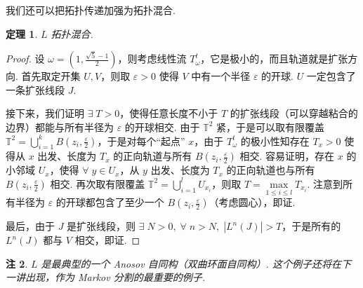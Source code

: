 \documentclass[11pt, a4paper, oneside]{ctexart}
\newtheorem{theorem}{定理}[section]
\newtheorem{remark}[theorem]{注}
\newcommand{\T}{\mathbb{T}}
\newcommand{\abs}[1]{\left|{#1}\right|}
\begin{document}
    我们还可以把拓扑传递加强为拓扑混合.
    \begin{theorem}
        $L$ 拓扑混合.
    \end{theorem}
    \begin{proof}
        设 $\omega=(1,\frac{\sqrt{5}-1}{2})$，则考虑线性流 $T_{\omega}^t$，它是极小的，而且轨道就是扩张方向. 首先取定开集 $U,V$，则取 $\varepsilon>0$ 使得 $V$ 中有一个半径 $\varepsilon$ 的开球. $U$ 一定包含了一条扩张线段 $J$.
        
        接下来，我们证明 $\exists\; T>0$，使得任意长度不小于 $T$ 的扩张线段（可以穿越粘合的边界）都能与所有半径为 $\varepsilon$ 的开球相交. 由于 $\T^2$ 紧，于是可以取有限覆盖 $\T^2=\bigcup\limits_{i=1}^{k}B(z_i,\frac{\varepsilon}{2})$，于是对每个“起点” $x$，由于 $T_{\omega}^t$ 的极小性知存在 $T_x>0$ 使得从 $x$ 出发、长度为 $T_x$ 的正向轨道与所有 $B(z_i,\frac{\varepsilon}{2})$ 相交. 容易证明，存在 $x$ 的小邻域 $U_x$，使得 $\forall\; y\in U_x$，从 $y$ 出发、长度为 $T_x$ 的正向轨道也与所有 $B(z_i,\frac{\varepsilon}{2})$ 相交. 再次取有限覆盖 $\T^2=\bigcup\limits_{i=1}^{l}U_{x_i}$，则取 $T=\max\limits_{1\leq i\leq l}T_{x_i}$. 注意到所有半径为 $\varepsilon$ 的开球都包含了至少一个 $B(z_i,\frac{\varepsilon}{2})$（考虑圆心），即证.

        最后，由于 $J$ 是扩张线段，则 $\exists\; N>0,\; \forall\; n>N,\; \abs{L^n(J)}>T$，于是所有的 $L^n(J)$ 都与 $V$ 相交，即证.
    \end{proof}
    \begin{remark}
        $L$ 是最典型的一个 Anosov 自同构（双曲环面自同构）. 这个例子还将在下一讲出现，作为 Markov 分割的最重要的例子.
    \end{remark}
\end{document}
